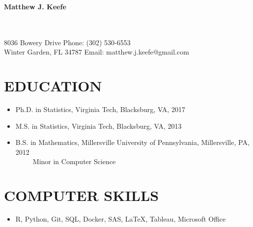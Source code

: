 \documentclass[10pt]{article}
\begin{document}
\begin{center}
{\Large{\bf{Matthew J. Keefe}}}\\
\end{center}
\underline{\hspace{7.3in}}\\
~~\\
8036 Bowery Drive  \hfill Phone: (302) 530-6553\\
Winter Garden, FL 34787 \hfill Email: matthew.j.keefe@gmail.com\\
\underline{\hspace{7.3in}}
\section*{EDUCATION}
\begin{itemize}
\item[] {Ph.D.} in Statistics,  Virginia Tech, Blacksburg, VA, 2017  
\item[] {M.S.} in Statistics, Virginia Tech, Blacksburg, VA, 2013 
\item[] { B.S.} in Mathematics, Millersville University of Pennsylvania, Millersville, PA, 2012\\
\mbox{~~~~~}Minor in Computer Science
\end{itemize}

\section*{COMPUTER SKILLS}
\begin{itemize}
\item[] R, Python, Git, SQL, Docker, SAS, \LaTeX, Tableau, Microsoft Office 
\end{itemize}
\end{document}
